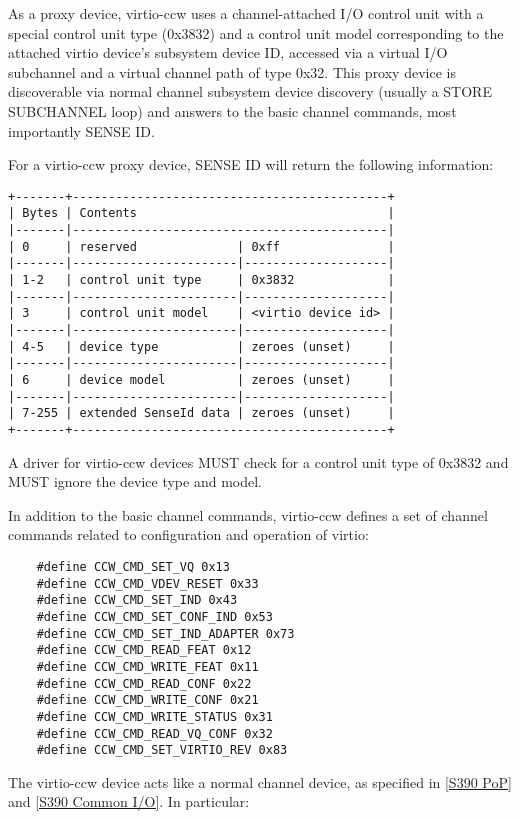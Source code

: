 As a proxy device, virtio-ccw uses a channel-attached I/O control
unit with a special control unit type (0x3832) and a control unit
model corresponding to the attached virtio device's subsystem
device ID, accessed via a virtual I/O subchannel and a virtual
channel path of type 0x32. This proxy device is discoverable via
normal channel subsystem device discovery (usually a STORE
SUBCHANNEL loop) and answers to the basic channel commands, most
importantly SENSE ID.

For a virtio-ccw proxy device, SENSE ID will return the following
information:

\begin{verbatim}
+-------+--------------------------------------------+
| Bytes | Contents                                   |
|-------|--------------------------------------------|
| 0     | reserved              | 0xff               |
|-------|-----------------------|--------------------|
| 1-2   | control unit type     | 0x3832             |
|-------|-----------------------|--------------------|
| 3     | control unit model    | <virtio device id> |
|-------|-----------------------|--------------------|
| 4-5   | device type           | zeroes (unset)     |
|-------|-----------------------|--------------------|
| 6     | device model          | zeroes (unset)     |
|-------|-----------------------|--------------------|
| 7-255 | extended SenseId data | zeroes (unset)     |
+-------+--------------------------------------------+
\end{verbatim}

A driver for virtio-ccw devices MUST check for a control unit
type of 0x3832 and MUST ignore the device type and model.

In addition to the basic channel commands, virtio-ccw defines a
set of channel commands related to configuration and operation of
virtio:

\begin{lstlisting}
	#define CCW_CMD_SET_VQ 0x13
	#define CCW_CMD_VDEV_RESET 0x33
	#define CCW_CMD_SET_IND 0x43
	#define CCW_CMD_SET_CONF_IND 0x53
	#define CCW_CMD_SET_IND_ADAPTER 0x73
	#define CCW_CMD_READ_FEAT 0x12
	#define CCW_CMD_WRITE_FEAT 0x11
	#define CCW_CMD_READ_CONF 0x22
	#define CCW_CMD_WRITE_CONF 0x21
	#define CCW_CMD_WRITE_STATUS 0x31
	#define CCW_CMD_READ_VQ_CONF 0x32
	#define CCW_CMD_SET_VIRTIO_REV 0x83
\end{lstlisting}

The virtio-ccw device acts like a normal channel device, as specified
in \hyperref[intro:S390 PoP]{[S390 PoP]} and \hyperref[intro:S390 Common I/O]{[S390 Common I/O]}. In particular:

